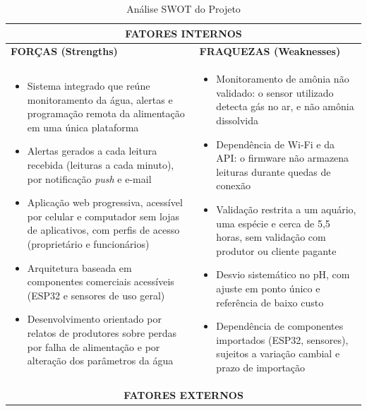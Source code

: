 \documentclass[11pt,a4paper]{article}
\begin{document}
\begin{table}[H]
\centering
\caption{Análise SWOT do Projeto}
\label{tab:swot}
\begin{tabular}{|p{7.2cm}|p{7.2cm}|}
\hline
\multicolumn{2}{|c|}{\cellcolor{secondarycolor!20}\textbf{FATORES INTERNOS}} \\
\hline
\textbf{FORÇAS (Strengths)} & \textbf{FRAQUEZAS (Weaknesses)} \\
\hline
\begin{minipage}[t]{7cm}\raggedright
\begin{itemize}
    \item Sistema integrado que reúne monitoramento da água, alertas e programação remota da alimentação em uma única plataforma
    \item Alertas gerados a cada leitura recebida (leituras a cada minuto), por notificação \textit{push} e e-mail
    \item Aplicação web progressiva, acessível por celular e computador sem lojas de aplicativos, com perfis de acesso (proprietário e funcionários)
    \item Arquitetura baseada em componentes comerciais acessíveis (ESP32 e sensores de uso geral)
    \item Desenvolvimento orientado por relatos de produtores sobre perdas por falha de alimentação e por alteração dos parâmetros da água
\end{itemize}
\end{minipage}
&
\begin{minipage}[t]{7cm}\raggedright
\begin{itemize}
    \item Monitoramento de amônia não validado: o sensor utilizado detecta gás no ar, e não amônia dissolvida
    \item Dependência de Wi-Fi e da API: o firmware não armazena leituras durante quedas de conexão
    \item Validação restrita a um aquário, uma espécie e cerca de 5,5 horas, sem validação com produtor ou cliente pagante
    \item Desvio sistemático no pH, com ajuste em ponto único e referência de baixo custo
    \item Dependência de componentes importados (ESP32, sensores), sujeitos a variação cambial e prazo de importação
\end{itemize}
\end{minipage}
\\
\hline
\multicolumn{2}{|c|}{\cellcolor{secondarycolor!20}\textbf{FATORES EXTERNOS}} \\

\end{tabular}
\end{table}
\end{document}
